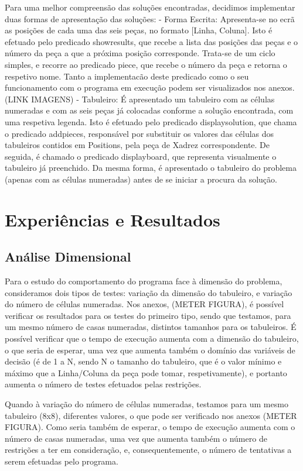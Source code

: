 \documentclass[runningheads]{llncs}
\begin{document}
Para uma melhor compreensão das soluções encontradas, decidimos implementar duas formas de apresentação das soluções:
 - Forma Escrita:
    Apresenta-se no ecrã as posições de cada uma das seis peças, no formato [Linha, Coluna].
    Isto é efetuado pelo predicado show\textunderscore results, que recebe a lista das posições das peças e o número da peça a que a próxima posição corresponde. Trata-se de um ciclo simples, e recorre ao predicado piece, que recebe o número da peça e retorna o respetivo nome.
    Tanto a implementacão deste predicado como o seu funcionamento com o programa em execução podem ser visualizados nos anexos. (LINK IMAGENS)
 - Tabuleiro:
    É apresentado um tabuleiro com as células numeradas e com as seis peças já colocadas conforme a solução encontrada, com uma respetiva legenda.
    Isto é efetuado pelo predicado display\textunderscore solution, que chama o predicado add\textunderscore pieces, responsável por substituir os valores das células dos tabuleiros contidos em Positions, pela peça de Xadrez correspondente. De seguida, é chamado o predicado display\textunderscore board, que representa visualmente o tabuleiro já preenchido.
    Da mesma forma, é apresentado o tabuleiro do problema (apenas com as células numeradas) antes de se iniciar a procura da solução.

\section{Experiências e Resultados}
\subsection{Análise Dimensional}
Para o estudo do comportamento do programa face à dimensão do problema, consideramos dois tipos de testes: variação da dimensão do tabuleiro, e variação do número de células numeradas.
Nos anexos, (METER FIGURA), é possível verificar os resultados para os testes do primeiro tipo, sendo que testamos, para um mesmo número de casas numeradas, distintos tamanhos para os tabuleiros.
É possível verificar que o tempo de execução aumenta com a dimensão do tabuleiro, o que seria de esperar, uma vez que aumenta também o domínio das variáveis de decisão (é de 1 a N, sendo N o tamanho do tabuleiro, que é o valor mínimo e máximo que a Linha/Coluna da peça pode tomar, respetivamente), e portanto aumenta o número de testes efetuados pelas restrições.

Quando à variação do número de células numeradas, testamos para um mesmo tabuleiro (8x8), diferentes valores, o que pode ser verificado nos anexos (METER FIGURA).
Como seria também de esperar, o tempo de execução aumenta com o número de casas numeradas, uma vez que aumenta também o número de restrições a ter em consideração, e, consequentemente, o número de tentativas a serem efetuadas pelo programa.
\end{document}

